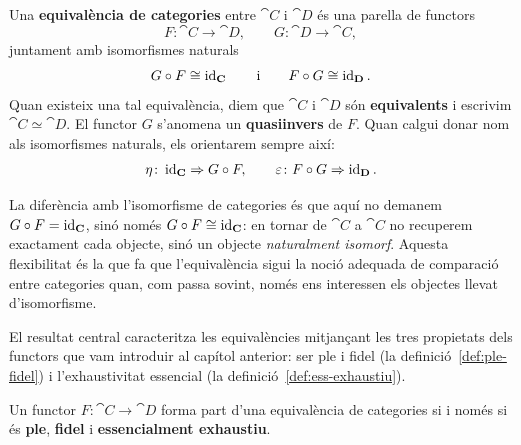 \begin{definicio}
\label{def:equivalencia}
Una \textbf{equivalència de categories} entre $\cat{C}$ i $\cat{D}$ és una parella de functors
\[
F\colon\cat{C}\to\cat{D},
\qquad
G\colon\cat{D}\to\cat{C},
\]
juntament amb isomorfismes naturals
\[
G\circ F\cong\operatorname{id}_{\mathbf{C}}
\qquad\text{i}\qquad
F\circ G\cong\operatorname{id}_{\mathbf{D}}.
\]
Quan existeix una tal equivalència, diem que $\cat{C}$ i $\cat{D}$ són \textbf{equivalents} i escrivim $\cat{C}\simeq\cat{D}$. El functor $G$ s'anomena un \textbf{quasiinvers} de $F$. Quan calgui donar nom als isomorfismes naturals, els orientarem sempre així:
\[
\eta\colon\operatorname{id}_{\mathbf{C}}\Rightarrow G\circ F,
\qquad
\varepsilon\colon F\circ G\Rightarrow\operatorname{id}_{\mathbf{D}}.
\]
\end{definicio}

\begin{observacio}
La diferència amb l'isomorfisme de categories és que aquí no demanem $G\circ F=\operatorname{id}_{\mathbf{C}}$, sinó només $G\circ F\cong\operatorname{id}_{\mathbf{C}}$: en tornar de $\cat{C}$ a $\cat{C}$ no recuperem exactament cada objecte, sinó un objecte \emph{naturalment isomorf}. Aquesta flexibilitat és la que fa que l'equivalència sigui la noció adequada de comparació entre categories quan, com passa sovint, només ens interessen els objectes llevat d'isomorfisme.
\end{observacio}

El resultat central caracteritza les equivalències mitjançant les tres propietats dels functors que vam introduir al capítol anterior: ser ple i fidel (la definició~\ref{def:ple-fidel}) i l'exhaustivitat essencial (la definició~\ref{def:ess-exhaustiu}).

\begin{teorema}
\label{teo:caract-equivalencia}
Un functor $F\colon\cat{C}\to\cat{D}$ forma part d'una equivalència de categories si i només si és \textbf{ple}, \textbf{fidel} i \textbf{essencialment exhaustiu}.
\end{teorema}

